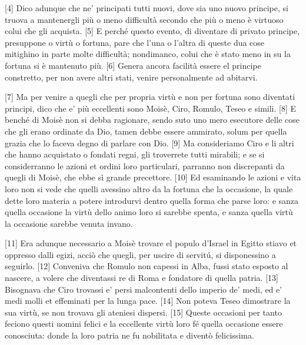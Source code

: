 {[}4{]} Dico adunque che ne' principati tutti nuovi, dove sia uno nuovo
principe, si truova a mantenergli più o meno difficultà secondo che più
o meno è virtuoso colui che gli acquista. {[}5{]} E perché questo
evento, di diventare di privato principe, presuppone o virtù o fortuna,
pare che l'una o l'altra di queste dua cose mitighino in parte molte
difficultà; nondimanco, colui che è stato meno in su la fortuna si è
mantenuto più. {[}6{]} Genera ancora facilità essere el principe
constretto, per non avere altri stati, venire personalmente ad abitarvi.

{[}7{]} Ma per venire a quegli che per propria virtù e non per fortuna
sono diventati principi, dico che e' più eccellenti sono Moisè, Ciro,
Romulo, Teseo e simili. {[}8{]} E benché di Moisè non si debba
ragionare, sendo suto uno mero esecutore delle cose che gli erano
ordinate da Dio, tamen debbe essere ammirato, solum per quella grazia
che lo faceva degno di parlare con Dio. {[}9{]} Ma consideriamo Ciro e
li altri che hanno acquistato o fondati regni, gli troverrete tutti
mirabili; e se si considerranno le azioni et ordini loro particulari,
parranno non discrepanti da quegli di Moisè, che ebbe sì grande
precettore. {[}10{]} Ed esaminando le azioni e vita loro non si vede che
quelli avessino altro da la fortuna che la occasione, la quale dette
loro materia a potere introdurvi dentro quella forma che parse loro: e
sanza quella occasione la virtù dello animo loro si sarebbe spenta, e
sanza quella virtù la occasione sarebbe venuta invano.

{[}11{]} Era adunque necessario a Moisè trovare el populo d'Israel in
Egitto stiavo et oppresso dalli egizi, acciò che quegli, per uscire di
servitú, si disponessino a seguirlo. {[}12{]} Conveniva che Romulo non
capessi in Alba, fussi stato esposto al nascere, a volere che diventassi
re di Roma e fondatore di quella patria. {[}13{]} Bisognava che Ciro
trovassi e' persi malcontenti dello imperio de' medi, ed e' medi molli
et effeminati per la lunga pace. {[}14{]} Non poteva Teseo dimostrare la
sua virtù, se non trovava gli ateniesi dispersi. {[}15{]} Queste
occasioni per tanto feciono questi uomini felici e la eccellente virtù
loro fé quella occasione essere conosciuta: donde la loro patria ne fu
nobilitata e diventò felicissima.

